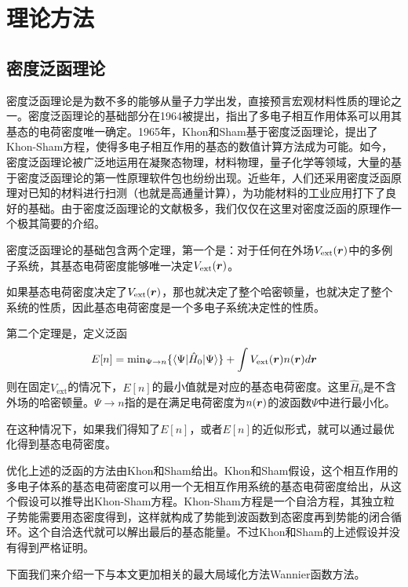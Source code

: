 \chapter{理论方法}
\label{cha:method}

\section{密度泛函理论}

密度泛函理论是为数不多的能够从量子力学出发，直接预言宏观材料性质的理论之一。密度泛函理论的基础部分在1964被提出\cite{hohenberg_inhomogeneous_1964}，指出了多电子相互作用体系可以用其基态的电荷密度唯一确定。1965年，Khon和Sham\cite{kohn_self-consistent_1965}基于密度泛函理论，提出了Khon-Sham方程，使得多电子相互作用的基态的数值计算方法成为可能。如今，密度泛函理论被广泛地运用在凝聚态物理，材料物理，量子化学等领域，大量的基于密度泛函理论的第一性原理软件包也纷纷出现。近些年，人们还采用密度泛函原理对已知的材料进行扫测（也就是高通量计算），为功能材料的工业应用打下了良好的基础。由于密度泛函理论的文献极多，我们仅仅在这里对密度泛函的原理作一个极其简要的介绍。

密度泛函理论的基础包含两个定理，第一个是：对于任何在外场$V_{\text{ext}}(\boldsymbol{r})$中的多例子系统，其基态电荷密度能够唯一决定$V_{\text{ext}}(\boldsymbol{r})$。

如果基态电荷密度决定了$V_{\text{ext}}(\boldsymbol{r})$，那也就决定了整个哈密顿量，也就决定了整个系统的性质，因此基态电荷密度是一个多电子系统决定性的性质。

第二个定理是，定义泛函
\begin{equation}
    E[n] = \text{min}_{\Psi\to n} \{\langle\Psi|\hat{H}_0|\Psi\rangle\}+\int V_\text{ext}(\boldsymbol{r}) n(\boldsymbol{r}) d\boldsymbol{r}
\end{equation}
则在固定$V_\text{ext}$的情况下，$E[n]$的最小值就是对应的基态电荷密度。这里$\hat{H}_0$是不含外场的哈密顿量。$\Psi\to n$指的是在满足电荷密度为$n(\boldsymbol{r})$的波函数$\Psi$中进行最小化。

在这种情况下，如果我们得知了$E[n]$，或者$E[n]$的近似形式，就可以通过最优化得到基态电荷密度。

优化上述的泛函的方法由Khon和Sham给出。Khon和Sham假设，这个相互作用的多电子体系的基态电荷密度可以用一个无相互作用系统的基态电荷密度给出，从这个假设可以推导出Khon-Sham方程。Khon-Sham方程是一个自洽方程，其独立粒子势能需要用态密度得到，这样就构成了势能到波函数到态密度再到势能的闭合循环。这个自洽迭代就可以解出最后的基态能量。不过Khon和Sham的上述假设并没有得到严格证明。

下面我们来介绍一下与本文更加相关的最大局域化方法Wannier函数方法。

